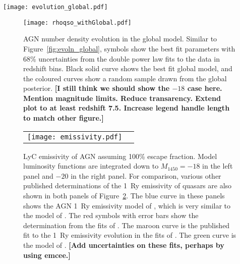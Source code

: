 \documentclass[a4paper,fleqn,usenatbib]{mnras}
\newcommand{\gk}[1]{{\bf \color{notecolor} [#1]}}
\begin{document}
\begin{figure*}
  \begin{center}
    \texttt{[image: evolution\_global.pdf]}
  \end{center}
  \caption{Luminosity function parameter evolution in the global
    model.  The symbols show the best fit parameters with 68\%
    uncertainties from the double power law fits to the data in
    redshift bins.  These points are identical to those in
    Figure~\ref{fig:evoln}, except that bins with BOSS qsos ($z\sim
    2$--$3$) are not shown.  In each panel, the black solid curve
    shows the best fit global model, and the coloured curves show a
    random sample drawn from the global posterior. \gk{Cannot see
      best-fit curves.  Add open and closed circles to legend.}}
  \label{fig:evoln_global}
\end{figure*}

\begin{figure}
  \begin{center}
    \texttt{[image: rhoqso\_withGlobal.pdf]}
  \end{center}
  \caption{AGN number density evolution in the global model.  Similar
    to Figure~\ref{fig:evoln_global}, symbols show the best fit
    parameters with 68\% uncertainties from the double power law fits
    to the data in redshift bins.  Black solid curve shows the best
    fit global model, and the coloured curves show a random sample
    drawn from the global posterior. \gk{I still think we should show
      the $-18$ case here.  Mention magnitude limits.  Reduce
      transarency.  Extend plot to at least redshift 7.5.  Increase
      legend handle length to match other figure.}}
  \label{fig:rhoqso}
\end{figure}

\begin{figure}
  \begin{center}
    \begin{tabular}{cc}
    \texttt{[image: emissivity.pdf]}
    \end{tabular}
  \end{center}
  \caption{LyC emissivity of AGN assuming 100\% escape fraction.
    Model luminosity functions are integrated down to $M_{1450}=-18$
    in the left panel and $-20$ in the right panel.  For comparison,
    various other published determinations of the 1~Ry emissivity of
    quasars are also shown in both panels of Figure~\ref{fig:e912}.
    The blue curve in these panels shows the AGN 1~Ry emissivity model
    of \citet{2012ApJ...746..125H}, which is very similar to the model
    of \citet{2007ApJ...654..731H}.  The red symbols with error bars
    show the determination from the fits of
    \citet{2015AA...578A..83G}.  The maroon curve is the published fit
    to the 1~Ry emissivity evolution in the fits of
    \citet{2017MNRAS.466.1160M}.  The green curve is the model of
    \citet{2015ApJ...813L...8M}. \gk{Add uncertainties on these fits,
      perhaps by using emcee.}}
  \label{fig:e912}
\end{figure}
\end{document}
